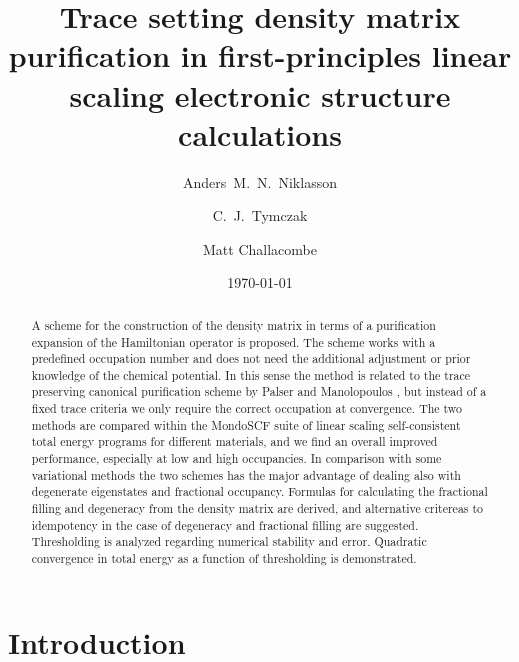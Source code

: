 \commentoutA{\documentclass[prb,aps,twocolumn,twocolumngrid,secnumarabic,superbib,hyperref]{revtex4}}
\begin{document}
\date{\today}

\title{Trace setting density matrix purification in first-principles
linear scaling electronic structure calculations}

\author{Anders~M.~N.~Niklasson\cite{Corr}}
\author{C.~J.~Tymczak}
\author{Matt Challacombe}

\begin{abstract}
A scheme for the construction of the density matrix in terms of
a purification expansion of the Hamiltonian operator is proposed. The scheme
works with a predefined occupation number and does not need
the additional adjustment or prior knowledge of the chemical potential.
In this sense the method is related to the trace preserving canonical 
purification scheme by Palser and Manolopoulos \cite{McWeeny60,Palser98}, 
but instead of a fixed trace criteria we only require the correct
occupation at convergence. The two methods are
compared within the MondoSCF suite of linear scaling self-consistent total energy
programs \cite{Mondo} for different materials, and we find an overall 
improved performance, especially at low and high occupancies. In comparison
with some variational methods the two schemes has the major advantage of
dealing also with degenerate eigenstates and fractional occupancy. 
Formulas for calculating the fractional filling and degeneracy from 
the density matrix are derived, and alternative critereas to idempotency
in the case of degeneracy and fractional filling are suggested.
Thresholding is analyzed regarding numerical stability and error.
Quadratic convergence in total energy as a function of thresholding
is demonstrated.
%
%
\end{abstract}

\maketitle

\section{Introduction}
\end{document}
